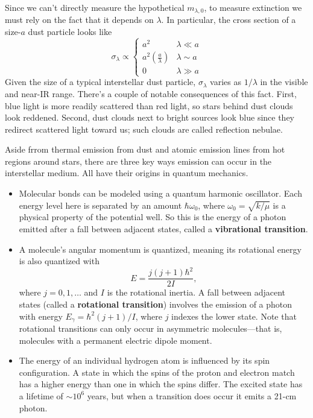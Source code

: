 \documentclass[../a062main.tex]{subfiles}
\begin{document}
Since we can't directly measure the hypothetical $m_{\lambda,0}$, to measure extinction we must rely on the fact that it depends on $\lambda$.
In particular, the cross section of a size-$a$ dust particle looks like
\[ \sigma_\lambda \propto \begin{cases} a^2 & \lambda \ll a \\ a^2 \left( \frac{a}{\lambda} \right) & \lambda \sim a \\ 0 & \lambda \gg a \end{cases} \]
Given the size of a typical interstellar dust particle, $\sigma_\lambda$ varies as $1 / \lambda$ in the visible and near-IR range.
There's a couple of notable consequences of this fact.
First, blue light is more readily scattered than red light, so stars behind dust clouds look reddened.
Second, dust clouds next to bright sources look blue since they redirect scattered light toward us; such clouds are called reflection nebulae.

Aside frrom thermal emission from dust and atomic emission lines from hot regions around stars, there are three key ways emission can occur in the interstellar medium.
All have their origins in quantum mechanics.
\begin{itemize}
    \item Molecular bonds can be modeled using a quantum harmonic oscillator.
    Each energy level here is separated by an amount $\hbar \omega_0$, where $\omega_0 = \sqrt{k / \mu}$ is a physical property of the potential well.
    So this is the energy of a photon emitted after a fall between adjacent states, called a \textbf{vibrational transition}.

    \item A molecule's angular momentum is quantized, meaning its rotational energy is also quantized with
    \[ E = \frac{j(j+1)\hbar^2}{2I}, \]
    where $j = 0,1,\ldots$ and $I$ is the rotational inertia.
    A fall between adjacent states (called a \textbf{rotational transition}) involves the emission of a photon with energy $E_\gamma = \hbar^2 (j+1) / I$, where $j$ indexes the lower state.
    Note that rotational transitions can only occur in asymmetric molecules---that is, molecules with a permanent electric dipole moment.

    \item The energy of an individual hydrogen atom is influenced by its spin configuration.
    A state in which the spins of the proton and electron match has a higher energy than one in which the spins differ.
    The excited state has a lifetime of $\sim 10^{6}$ years, but when a transition does occur it emits a 21-cm photon.
\end{itemize}
\end{document}
